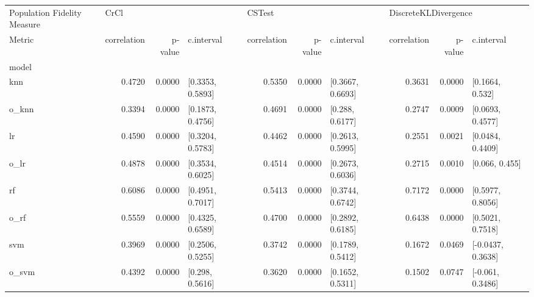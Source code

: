 \begin{tabular}{lrrlrrlrrl}
\toprule
Population Fidelity Measure & \multicolumn{3}{l}{CrCl} & \multicolumn{3}{l}{CSTest} & \multicolumn{3}{l}{DiscreteKLDivergence} \\
Metric & correlation & p-value &        c.interval & correlation & p-value &        c.interval &          correlation & p-value &         c.interval \\
model &             &         &                   &             &         &                   &                      &         &                    \\
\midrule
knn   &      0.4720 &  0.0000 &  [0.3353, 0.5893] &      0.5350 &  0.0000 &  [0.3667, 0.6693] &               0.3631 &  0.0000 &    [0.1664, 0.532] \\
o\_knn &      0.3394 &  0.0000 &  [0.1873, 0.4756] &      0.4691 &  0.0000 &   [0.288, 0.6177] &               0.2747 &  0.0009 &   [0.0693, 0.4577] \\
lr    &      0.4590 &  0.0000 &  [0.3204, 0.5783] &      0.4462 &  0.0000 &  [0.2613, 0.5995] &               0.2551 &  0.0021 &   [0.0484, 0.4409] \\
o\_lr  &      0.4878 &  0.0000 &  [0.3534, 0.6025] &      0.4514 &  0.0000 &  [0.2673, 0.6036] &               0.2715 &  0.0010 &     [0.066, 0.455] \\
rf    &      0.6086 &  0.0000 &  [0.4951, 0.7017] &      0.5413 &  0.0000 &  [0.3744, 0.6742] &               0.7172 &  0.0000 &   [0.5977, 0.8056] \\
o\_rf  &      0.5559 &  0.0000 &  [0.4325, 0.6589] &      0.4700 &  0.0000 &  [0.2892, 0.6185] &               0.6438 &  0.0000 &   [0.5021, 0.7518] \\
svm   &      0.3969 &  0.0000 &  [0.2506, 0.5255] &      0.3742 &  0.0000 &  [0.1789, 0.5412] &               0.1672 &  0.0469 &  [-0.0437, 0.3638] \\
o\_svm &      0.4392 &  0.0000 &   [0.298, 0.5616] &      0.3620 &  0.0000 &  [0.1652, 0.5311] &               0.1502 &  0.0747 &   [-0.061, 0.3486] \\
\bottomrule
\end{tabular}
